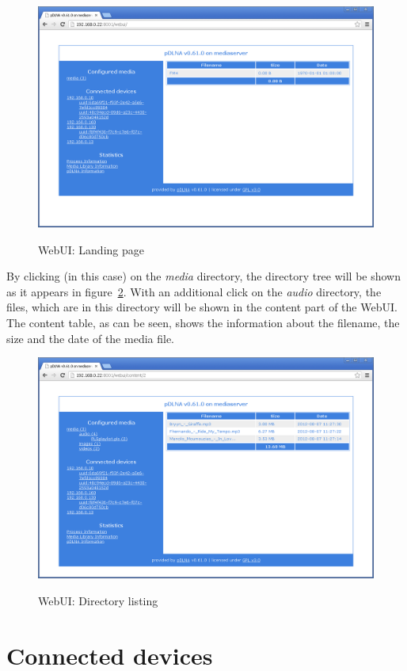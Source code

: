 \documentclass[a4paper,oneside,10pt]{report}
\begin{document}
\begin{figure}
	\centering
		\includegraphics[width=34em]{images/webui_content_landing}
	\label{fig:webgui-landingpage}
	\caption{WebUI: Landing page}
\end{figure}

By clicking (in this case) on the {\em media} directory, the directory tree will be shown as it appears in figure~\ref{fig:webgui-audio}. With an additional click on the {\em audio} directory, the files, which are in this directory will be shown in the content part of the WebUI. The content table, as can be seen, shows the information about the filename, the size and the date of the media file.

\begin{figure}
	\centering
		\includegraphics[width=34em]{images/webui_content_audio}
	\label{fig:webgui-audio}
	\caption{WebUI: Directory listing}
\end{figure}

\section{Connected devices}
\end{document}
